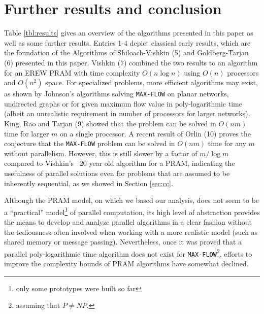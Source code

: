 \documentclass[a4paper,10pt, twocolumn]{article}
\begin{document}
\section{Further results and conclusion}
\label{sec:further}
Table \ref{tbl:results} gives an overview of the algorithms presented in this paper as well as some further results. Entries 1-4 depict classical early results, which are the foundation of the Algorithms of Shiloach-Vishkin (5) and Goldberg-Tarjan (6) presented in this paper.  Vishkin (7) combined the two results to an algorithm for an EREW PRAM with time complexity $O(n \log n)$ using $O(n)$ processors and $O(n^{2})$ space. For specialized problems, more efficient algorithms may exist, as shown by Johnson's algorithms solving \lstinline|MAX-FLOW| on planar networks, undirected graphs or for  given maximum flow value in poly-logarithmic time (albeit an unrealistic requirement in number of processors for larger networks). King, Rao and Tarjan (9) showed that the problem can be solved in $O(nm)$ time for larger $m$ on a single processor. A recent result of Orlin (10) proves the conjecture that the \lstinline|MAX-FLOW| problem can be solved in $O(nm)$ time for any $m$ without parallelism. However, this is still slower by a factor of $m/ \log m$ compared to Vishkin's~\cite{vishkin92} 20 year old algorithm for a PRAM, indicating the usefulness of parallel solutions even for problems that are assumed to be inherently sequential, as we showed in Section \ref{sec:cc}.

Although the PRAM model, on which we based our analysis, does not seem to be a ``practical'' model\footnote{only some prototypes were built so far} of parallel computation, its high level of abstraction provides the means to develop and analyze parallel algorithms in a clear fashion without the tediousness often involved when working with a more realistic model (such as shared memory or message passing).  Nevertheless, once it was proved that a parallel poly-logarithmic time algorithm does not exist for \lstinline|MAX-FLOW|\footnote{assuming that $P \neq NP$.}, efforts to improve the complexity bounds of PRAM algorithms have somewhat declined.


\printbibliography
\end{document}

